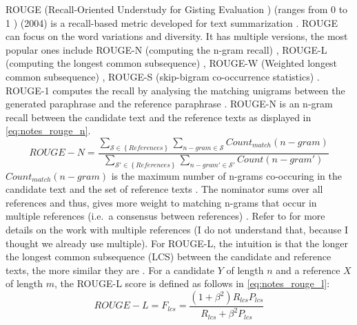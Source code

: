 ROUGE (Recall-Oriented Understudy for Gisting Evaluation \citep{palivela_optimization_2021,lin_rouge_2004}) 
(ranges from 0 to 1 \citep{kurt_pehlivanoglu_comparative_2024}) (2004) 
is a recall-based metric developed for text summarization \citep{zhou_paraphrase_2021,palivela_optimization_2021,kurt_pehlivanoglu_comparative_2024,lin_rouge_2004}.
ROUGE can focus on the word variations and diversity.
It has multiple versions, the most popular ones include 
ROUGE-N (computing the n-gram recall) \citep{zhou_paraphrase_2021,palivela_optimization_2021,kurt_pehlivanoglu_comparative_2024}, 
ROUGE-L (computing the longest common subsequence) \citep{zhou_paraphrase_2021,palivela_optimization_2021,kurt_pehlivanoglu_comparative_2024}, 
ROUGE-W (Weighted longest common subsequence) \citep{palivela_optimization_2021}, 
ROUGE-S (skip-bigram co-occurrence statistics) \citep{palivela_optimization_2021}.
ROUGE-1 computes the recall by analysing the matching unigrams between the generated paraphrase and the reference paraphrase \citep{palivela_optimization_2021,kurt_pehlivanoglu_comparative_2024}.
ROUGE-N is an n-gram recall between the candidate text and the reference texts \citep{lin_rouge_2004} as displayed in \autoref{eq:notes_rouge_n}.
\begin{equation}
    ROUGE-N = \frac{\sum_{\mathcal{S} \in \left\{ References \right\}}\sum_{n-gram \in\mathcal{S}}Count_{match}(n-gram)}{\sum_{\mathcal{S'} \in \left\{ References \right\}}\sum_{n-gram' \in\mathcal{S'}}Count(n-gram')}
\label{eq:notes_rouge_n}
\end{equation}
$Count_{match}(n-gram)$ is the maximum number of n-grams co-occuring in the candidate text and the set of reference texts \citep{lin_rouge_2004}.
The nominator sums over all references and thus, gives more weight to matching n-grams that occur in multiple references (i.e.\ a consensus between references) \citep{lin_rouge_2004}.
Refer to \citet{lin_rouge_2004} for more details on the work with multiple references (I do not understand that, because I thought we already use multiple).
For ROUGE-L, the intuition is that the longer the longest common subsequence (LCS) between the candidate and reference texts, the more similar they are \citep{lin_rouge_2004}.
For a candidate $Y$ of length $n$ and a reference $X$ of length $m$, the ROUGE-L score is defined as follows in \autoref{eq:notes_rouge_l}:
\begin{equation}
    ROUGE-L = F_{lcs} = \frac{(1 + \beta^2)R_{lcs}P_{lcs}}{R_{lcs} + \beta^2 P_{lcs}}
\label{eq:notes_rouge_l}
\end{equation}
